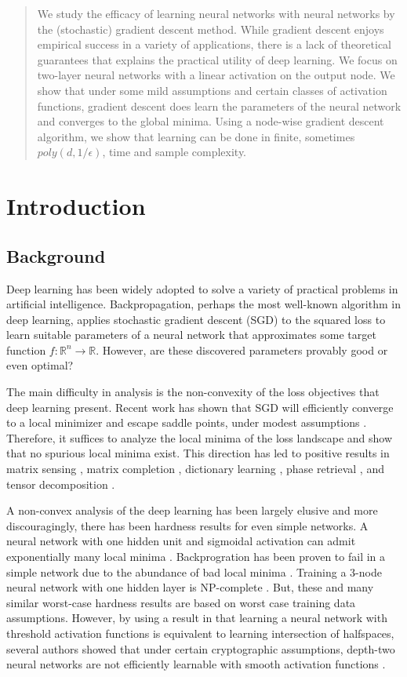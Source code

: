 \documentclass{article}
\newcommand{\R}{{\mathbb{R}}}
\begin{document}
\begin{abstract} 
We study the efficacy of learning neural networks with neural networks by the (stochastic) gradient descent method. While gradient descent enjoys empirical success in a variety of applications, there is a lack of theoretical guarantees that explains the practical utility of deep learning. We focus on two-layer neural networks with a linear activation on the output node. We show that under some mild assumptions and certain classes of activation functions, gradient descent does learn the parameters of the neural network and converges to the global minima. Using a node-wise gradient descent algorithm, we show that learning can be done in finite, sometimes $poly(d,1/\epsilon)$, time and sample complexity.
\end{abstract} 

\section{Introduction}

\subsection{Background}
Deep learning has been widely adopted to solve a variety of practical problems in artificial intelligence. Backpropagation, perhaps the most well-known algorithm in deep learning, applies stochastic gradient descent (SGD) to the squared loss to learn suitable parameters of a neural network that approximates some target function $f: \R^n \to \R$. However, are these discovered parameters provably good or even optimal? 

The main difficulty in analysis is the non-convexity of the loss objectives that deep learning present. Recent work has shown that SGD will efficiently converge to a local minimizer and escape saddle points, under modest assumptions \cite{GeHJY15}. Therefore, it suffices to analyze the local minima of the loss landscape and show that no spurious local minima exist. This direction has led to positive results in matrix sensing \cite{ParkKCS16a}, matrix completion \cite{GeLM16}, dictionary learning \cite{SunQW15}, phase retrieval \cite{SunQW16}, and tensor decomposition \cite{GeHJY15}. 

A non-convex analysis of the deep learning has been largely elusive and more discouragingly, there has been hardness results for even simple networks. A neural network with one hidden unit and sigmoidal activation can admit exponentially many local minima \cite{Auer}. Backprogration has been proven to fail in a simple network due to the abundance of bad local minima \cite{brady1989back}. Training a 3-node neural network with one hidden layer is { NP}-complete \cite{BlumR88}.  But, these and many similar worst-case hardness results are based on worst case training data assumptions. However, by using a result in \cite{klivans2006cryptographic} that learning a neural network with threshold activation functions is equivalent to learning intersection of halfspaces, several authors showed that under certain cryptographic assumptions, depth-two neural networks are not efficiently learnable with smooth activation functions \cite{LivniSS14} \cite{ZhangLWJ15}\cite{ZhangLJ15}. 
\end{document}
